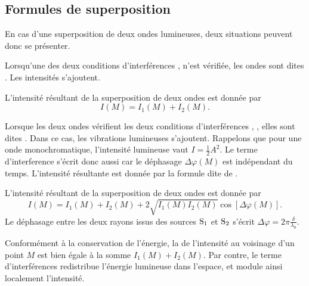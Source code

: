 \documentclass[12pt,fancy]{cours}
\begin{document}
\subsection{Formules de superposition}

En cas d’une superposition de deux ondes lumineuses, deux situations peuvent donc se présenter.
\begin{liste}
\item Lorsqu’une des deux conditions d'interférences ,  n’est  vérifiée, les ondes sont dites . Les intensités s’ajoutent.
\begin{theorem}\label{form:incoh}
L'intensité résultant de la superposition de deux ondes  est donnée par
\begin{equation*}
I(M) = I_{1}(M)+I_{2}(M).
\end{equation*}
\end{theorem}
\item Lorsque les deux ondes vérifient les deux conditions d'interférences , , elles sont dites . Dans ce cas, les vibrations lumineuses s’ajoutent. Rappelons que pour une onde monochromatique, l'intensité lumineuse vaut $I = \frac{1}{2}A^2$. Le terme d'interference s'écrit donc aussi 
car le déphasage $\Delta\varphi(M)$ est indépendant du temps.
L'intensité résultante est donnée par la formule dite de .
\begin{theorem}\label{form:Fresnel}
L'intensité résultant de la superposition de deux ondes  est donnée par
\begin{equation*}
I(M)=I_{1}(M)+I_{2}(M)+2\sqrt{I_1(M) I_2(M)}\cos\left[\Delta\varphi(M)\right].
\end{equation*}
Le déphasage entre les deux rayons issus des sources $\rm S_1$ et $\rm S_2$ s'écrit $\Delta\varphi=2\pi\frac{\delta}{\lambda_0}$.
\end{theorem}
\begin{remarque}
  Conformément à la conservation de l'énergie, la  de l'intensité au voisinage d'un point $M$ est bien égale à la somme $I_1(M)+I_2(M)$. Par contre, le terme d'interférences redistribue l'énergie lumineuse dans l'espace, et module ainsi localement l'intensité.
\end{remarque}
\end{liste}
\end{document}
